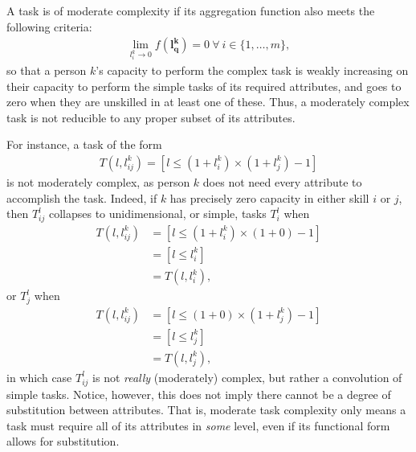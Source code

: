 {\begin{definition}
        \begin{subdefinition}
            A task is of moderate complexity if its aggregation function also meets the following criteria:
            \begin{gather}
                \lim_{
                    l_{i}^{k} \rightarrow 0
                }{
                    f(\boldsymbol{l_{q}^{k}})
                } = 0
                \
                \forall 
                \
                i \in \{1, \dots, m\}
                ,
            \end{gather}
            so that a person $k$'s capacity to perform the complex task is weakly increasing on their capacity to perform the simple tasks of its required attributes, and goes to zero when they are unskilled in at least one of these. Thus, a moderately complex task is not reducible to any proper subset of its attributes.
            
            For instance, a task of the form
        \begin{gather}
            T(l, l_{ij}^{k})
            = [l \leq (1 + l_{i}^{k}) \times (1 + l_{j}^{k}) - 1]
        \end{gather}
        is not moderately complex, as person $k$ does not need every attribute to accomplish the task. Indeed, if $k$ has precisely zero capacity in either skill $i$ or $j$, then $T_{ij}^{l}$ collapses to unidimensional, or simple, tasks $T_{i}^{l}$ when
        \begin{align}
            T(l, l_{ij}^{k})
            &= [l \leq (1 + l_{i}^{k}) \times (1 + 0) - 1]
            \\
            &= [l \leq l_{i}^{k}]
            \\
            &= T(l, l_{i}^{k})
            ,
        \end{align}
        or $T_{j}^{l}$ when
        \begin{align}
            T(l, l_{ij}^{k})
            &= [l \leq (1 + 0) \times (1 + l_{j}^{k}) - 1]
            \\
            &= [l \leq l_{j}^{k}]
            \\
            &= T(l, l_{j}^{k})
            ,
        \end{align}
        in which case $T_{ij}^{l}$ is not \textit{really} (moderately) complex, but rather a convolution of simple tasks. Notice, however, this does not imply there cannot be a degree of substitution between attributes. That is, moderate task complexity only means a task must require all of its attributes in \textit{some} level, even if its functional form allows for substitution.
        

\end{subdefinition}
\end{definition}}
